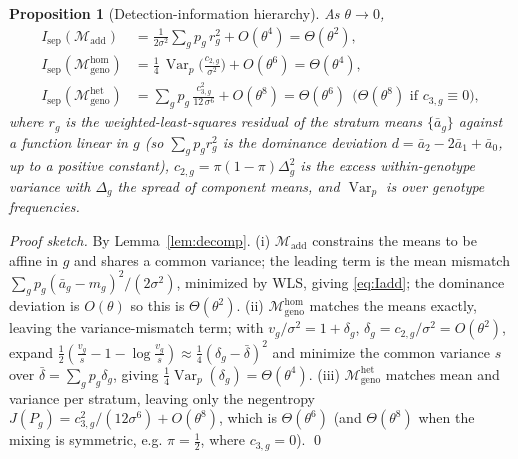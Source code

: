 \documentclass[11pt]{article}
\newtheorem{proposition}{Proposition}
\newcommand{\Var}{\operatorname{Var}}
\begin{document}
\begin{proposition}[Detection-information hierarchy]\label{prop:hier}
As $\theta\to0$,
\begin{align}
I_{\mathrm{sep}}(\mathcal M_{\mathrm{add}})
&=\frac{1}{2\sigma^2}\sum_g p_g\,r_g^2+O(\theta^4)
=\Theta(\theta^2), \label{eq:Iadd}\\[2pt]
I_{\mathrm{sep}}(\mathcal M_{\mathrm{geno}}^{\mathrm{hom}})
&=\frac14\,\Var_p\!\Big(\tfrac{c_{2,g}}{\sigma^2}\Big)+O(\theta^6)
=\Theta(\theta^4), \label{eq:Ihom}\\[2pt]
I_{\mathrm{sep}}(\mathcal M_{\mathrm{geno}}^{\mathrm{het}})
&=\sum_g p_g\,\frac{c_{3,g}^2}{12\,\sigma^6}+O(\theta^8)
=\Theta(\theta^6)\ \ \big(\Theta(\theta^8)\text{ if }c_{3,g}\!\equiv\!0\big),
\label{eq:Ihet}
\end{align}
where $r_g$ is the weighted-least-squares residual of the stratum means
$\{\bar a_g\}$ against a function linear in $g$ (so $\sum_g p_g r_g^2$ is the
\emph{dominance deviation} $d=\bar a_2-2\bar a_1+\bar a_0$, up to a positive
constant), $c_{2,g}=\pi(1-\pi)\Delta_g^2$ is the excess within-genotype variance
with $\Delta_g$ the spread of component means, and $\Var_p$ is over genotype
frequencies.
\end{proposition}

\begin{proof}[Proof sketch]
By Lemma~\ref{lem:decomp}. (i) $\mathcal M_{\mathrm{add}}$ constrains the means
to be affine in $g$ and shares a common variance; the leading term is the mean
mismatch $\sum_g p_g(\bar a_g-m_g)^2/(2\sigma^2)$, minimized by WLS, giving
\eqref{eq:Iadd}; the dominance deviation is $O(\theta)$ so this is $\Theta(\theta^2)$.
(ii) $\mathcal M_{\mathrm{geno}}^{\mathrm{hom}}$ matches the means exactly,
leaving the variance-mismatch term; with $v_g/\sigma^2=1+\delta_g$,
$\delta_g=c_{2,g}/\sigma^2=O(\theta^2)$, expand
$\tfrac12(\tfrac{v_g}{s}-1-\log\tfrac{v_g}{s})\approx\tfrac14(\delta_g-\bar\delta)^2$
and minimize the common variance $s$ over $\bar\delta=\sum_g p_g\delta_g$, giving
$\tfrac14\Var_p(\delta_g)=\Theta(\theta^4)$. (iii)
$\mathcal M_{\mathrm{geno}}^{\mathrm{het}}$ matches mean and variance per stratum,
leaving only the negentropy $J(P_g)=c_{3,g}^2/(12\sigma^6)+O(\theta^8)$, which is
$\Theta(\theta^6)$ (and $\Theta(\theta^8)$ when the mixing is symmetric, e.g.
$\pi=\tfrac12$, where $c_{3,g}=0$). \qed
\end{proof}
\end{document}
